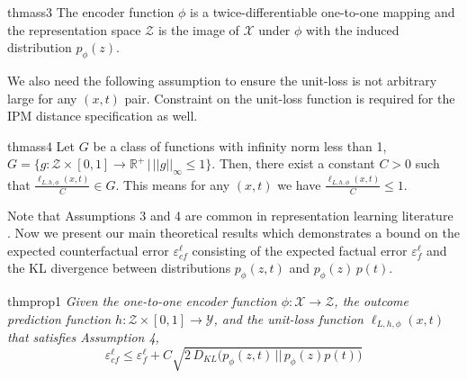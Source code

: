 \documentclass[letterpaper]{article} %
\begin{document}
\newline
\newline
\begin{restatable*}{thm}{ass3} 
\label{thm:ass3}
The encoder function $\phi$ is a twice-differentiable one-to-one mapping and the representation space $\mathcal{Z}$ is the image of $\mathcal{X}$ under $\phi$ with the induced distribution $p_{\phi}(z)$.
\end{restatable*}
\newline
\newline
We also need the following assumption to ensure the unit-loss is not arbitrary large for any $(x, t)$ pair. Constraint on the unit-loss function is required for the IPM distance specification as well.
\newline
\newline
\begin{restatable*}{thm}{ass4} 
Let $G$ be a class of functions with infinity norm less than 1, $G = \{g : \mathcal{Z} \times [0, 1] \rightarrow \mathbb{R}^+ \, | \,  ||g||_{\infty} \le 1 \}$. Then, there exist a constant $C > 0$ such that $
\frac{
    \ell_{L, h, \phi}(x, t)
}{
C
} \in G
$. This means for any $(x, t)$ we have $\frac{
    \ell_{L, h, \phi}(x, t)
}{
C
} \le 1$.
\end{restatable*}
\newline
\newline
Note that Assumptions 3 and 4 are common in representation learning literature \cite{shalit2017estimating, bellot2022generalization, hassanpour2019learning}.
Now we present our main theoretical results which demonstrates a bound on the expected counterfactual error $\varepsilon_{cf}^{\ell}$ consisting of the expected factual error $\varepsilon_f^{\ell}$ and the KL divergence between distributions $p_{\phi}(z, t)$ and $p_{\phi}(z)\,p(t)$.
\newline
\newline
\begin{restatable*}{thm}{prop1} 
\textit{
Given the one-to-one encoder function $\phi : \mathcal{X} \rightarrow \mathcal{Z}$, the outcome prediction function $h : \mathcal{Z} \times [0, 1] \rightarrow \mathcal{Y}$, and the unit-loss function $\ell_{L, h, \phi}(x, t)$ that satisfies Assumption 4,
\[
\varepsilon_{cf}^{\ell} \le \varepsilon_f^{\ell} + C \sqrt{ 2\, D_{KL}\bigg(p_{\phi}(z, t)\,  \big|\big| \, p_{\phi}(z)p(t)\bigg)}
\]
}
\end{restatable*}
\end{document}
